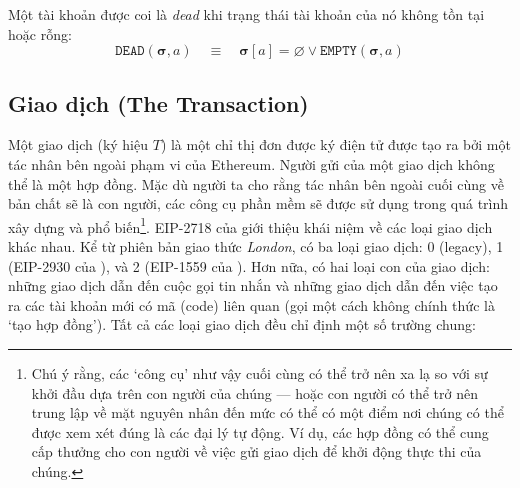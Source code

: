 \documentclass[9pt,oneside]{amsart}
\begin{document}
\begin{multicols}{2}
Một tài khoản được coi là \textit{dead} khi trạng thái tài khoản của nó không tồn tại hoặc rỗng:
\begin{equation}
\mathtt{DEAD}(\boldsymbol{\sigma}, a) \quad\equiv\quad \boldsymbol{\sigma}[a] = \varnothing \vee \mathtt{EMPTY}(\boldsymbol{\sigma}, a)
\end{equation}

\subsection{Giao dịch (The Transaction)} \label{subsec:transaction}

Một giao dịch (ký hiệu $T$) là một chỉ thị đơn được ký điện tử được tạo ra bởi một tác nhân bên ngoài phạm vi của Ethereum.
Người gửi của một giao dịch không thể là một hợp đồng. Mặc dù người ta cho rằng tác nhân bên ngoài cuối cùng về bản chất sẽ là con người, các công cụ phần mềm sẽ được sử dụng trong quá trình xây dựng và phổ biến\footnote{Chú ý rằng,
các `công cụ' như vậy cuối cùng có thể trở nên xa lạ so với sự khởi đầu dựa trên con người của chúng — hoặc con người có thể trở nên trung lập về mặt nguyên nhân đến mức có thể có một điểm nơi chúng có thể được xem xét đúng là các đại lý tự động. Ví dụ, các hợp đồng có thể cung cấp thưởng cho con người về việc gửi giao dịch để khởi động thực thi của chúng.}.
EIP-2718 của \cite{EIP-2718} giới thiệu khái niệm về các loại giao dịch khác nhau.
Kể từ phiên bản giao thức \textit{London}, có ba loại giao dịch: 0 (legacy), 1 (EIP-2930 của \cite{EIP-2930}), và 2 (EIP-1559 của \cite{EIP-1559}).
Hơn nữa, có hai loại con của giao dịch: những giao dịch dẫn đến cuộc gọi tin nhắn và những giao dịch dẫn đến việc tạo ra các tài khoản mới có mã (code) liên quan (gọi một cách không chính thức là `tạo hợp đồng'). Tất cả các loại giao dịch đều chỉ định một số trường chung:


\end{multicols}
\end{document}
